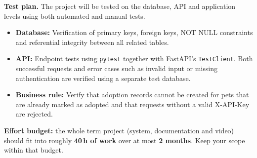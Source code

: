\documentclass[11pt,a4paper]{article}
\begin{document}
\textbf{Test plan.} The project will be tested on the database, API and application levels using
both automated and manual tests.
\begin{itemize}[topsep=2pt]
  \item \textbf{Database:} Verification of primary keys, foreign keys, NOT NULL constraints and referential
integrity between all related tables.
  \item \textbf{API:} Endpoint tests using \texttt{pytest} together with FastAPI's
\texttt{TestClient}. Both successful requests and error cases such as invalid
input or missing authentication are verified using a separate test database.
  \item \textbf{Business rule:} Verify that adoption records cannot be created for pets that are already marked
as adopted and that requests without a valid X-API-Key are rejected.
\end{itemize}

\vspace{1em}
\begin{infobox}
\textbf{Effort budget:} the whole term project (system, documentation and video)
should fit into roughly \textbf{40\,h of work} over at most \textbf{2 months}.
Keep your scope within that budget.
\end{infobox}
\end{document}
